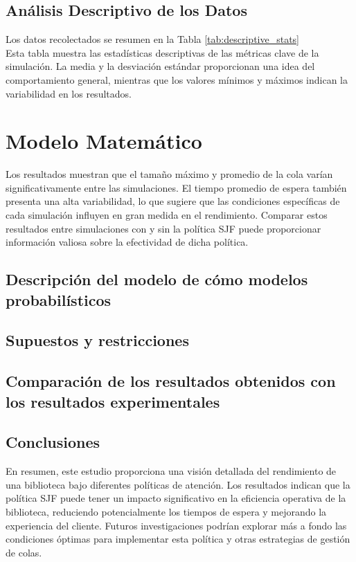 \documentclass[10pt,twocolumn]{article}
\begin{document}
\subsection{Análisis Descriptivo de los Datos}
Los datos recolectados se resumen en la Tabla \ref{tab:descriptive_stats} \\

Esta tabla muestra las estadísticas descriptivas de las métricas clave de la simulación. La media y la desviación estándar proporcionan una idea del comportamiento general, mientras que los valores mínimos y máximos indican la variabilidad en los resultados.







\section{Modelo Matemático}
Los resultados muestran que el tamaño máximo y promedio de la cola varían significativamente entre las simulaciones. El tiempo promedio de espera también presenta una alta variabilidad, lo que sugiere que las condiciones específicas de cada simulación influyen en gran medida en el rendimiento. Comparar estos resultados entre simulaciones con y sin la política SJF puede proporcionar información valiosa sobre la efectividad de dicha política.
\subsection{Descripción del modelo de cómo modelos probabilísticos}
\subsection{Supuestos y restricciones}
\subsection{Comparación de los resultados obtenidos con los resultados experimentales}

\subsection{Conclusiones}
En resumen, este estudio proporciona una visión detallada del rendimiento de una biblioteca bajo diferentes políticas de atención. Los resultados indican que la política SJF puede tener un impacto significativo en la eficiencia operativa de la biblioteca, reduciendo potencialmente los tiempos de espera y mejorando la experiencia del cliente. Futuros investigaciones podrían explorar más a fondo las condiciones óptimas para implementar esta política y otras estrategias de gestión de colas.
\end{document}
